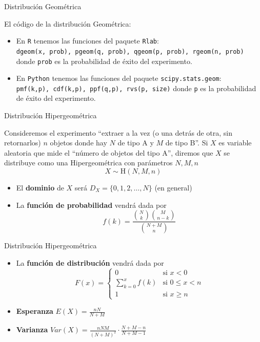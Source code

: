 \documentclass[
  ignorenonframetext,
]{beamer}
\providecommand{\tightlist}{%
  \setlength{\itemsep}{0pt}\setlength{\parskip}{0pt}}
\begin{document}
\begin{frame}[fragile]{Distribución Geométrica}
\protect\hypertarget{distribuciuxf3n-geomuxe9trica-3}{}

El código de la distribución Geométrica:

\begin{itemize}
\tightlist
\item
  En \texttt{R} tenemos las funciones del paquete \texttt{Rlab}:
  \texttt{dgeom(x,\ prob),\ pgeom(q,\ prob),\ qgeom(p,\ prob),\ rgeom(n,\ prob)}
  donde \texttt{prob} es la probabilidad de éxito del experimento.
\item
  En \texttt{Python} tenemos las funciones del paquete
  \texttt{scipy.stats.geom}:
  \texttt{pmf(k,p),\ cdf(k,p),\ ppf(q,p),\ rvs(p,\ size)} donde
  \texttt{p} es la probabilidad de éxito del experimento.
\end{itemize}

\end{frame}

\begin{frame}{Distribución Hipergeométrica}
\protect\hypertarget{distribuciuxf3n-hipergeomuxe9trica}{}

Consideremos el experimento ``extraer a la vez (o una detrás de otra,
sin retornarlos) \(n\) objetos donde hay \(N\) de tipo A y \(M\) de tipo
B''. Si \(X\) es variable aleatoria que mide el ``número de objetos del
tipo A'', diremos que \(X\) se distribuye como una Hipergeométrica con
parámetros \(N,M,n\) \[X\sim \text{H}(N,M,n)\]

\begin{itemize}
\tightlist
\item
  El \textbf{dominio} de \(X\) será \(D_X = \{0,1,2,\dots,N\}\) (en
  general)
\item
  La \textbf{función de probabilidad} vendrá dada por
  \[f(k) = \frac{{N\choose k}{M\choose n-k}}{N+M\choose n}\]
\end{itemize}

\end{frame}

\begin{frame}{Distribución Hipergeométrica}
\protect\hypertarget{distribuciuxf3n-hipergeomuxe9trica-1}{}

\begin{itemize}
\tightlist
\item
  La \textbf{función de distribución} vendrá dada por \[F(x) = \left\{
  \begin{array}{cl}
     0 & \text{si } x<0 
  \\ \sum_{k=0}^xf(k) & \text{si } 0\le x<n
  \\ 1 & \text{si } x\ge n
  \end{array}
  \right.\]
\item
  \textbf{Esperanza} \(E(X) = \frac{nN}{N+M}\)
\item
  \textbf{Varianza}
  \(Var(X) = \frac{nNM}{(N+M)^2}\cdot\frac{N+M-n}{N+M-1}\)
\end{itemize}

\end{frame}
\end{document}
